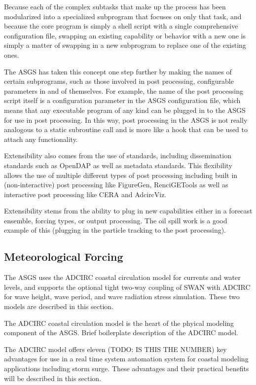 \documentclass[jmse,article,submit,moreauthors,pdftex,12pt,a4paper]{mdpi}
\begin{document}
Because each of the complex subtasks that make up the process has 
been modularized into a specialized subprogram that focuses on only 
that task, and because the core program is simply a shell script 
with a single comprehensive configuration file, swapping an existing 
capability or behavior with a new one is simply a matter of swapping 
in a new subprogram to replace one of the existing ones.

The ASGS has taken this concept one step further by making the names 
of certain subprograms, such as those involved in post processing, 
configurable parameters in and of themselves. For example, the name 
of the post processing script itself is a configuration parameter in 
the ASGS configuration file, which means that any executable program 
of any kind can be plugged in to the ASGS for use in post 
processing. In this way, post processing in the ASGS is not really 
analogous to a static subroutine call and is more like a hook that 
can be used to attach any functionality.  

Extensibility also comes from the use of standards, including 
dissemination standards such as OpenDAP as well as metadata 
standards. This flexibility allows the use of multiple different 
types of post processing including built in (non-interactive) post 
processing like FigureGen, RenciGETools as well as interactive post 
processing like CERA and AdcircViz.

Extensibility stems from the ability to plug in new capabilities 
either in a forecast ensemble, forcing types, or output processing. 
The oil spill work is a good example of this (plugging in the 
particle tracking to the post processing). 

\subsection{Meteorological Forcing}

The ASGS uses the ADCIRC coastal circulation model for currents and 
water levels, and supports the optional tight two-way coupling of 
SWAN with ADCIRC for wave height, wave period, and wave radiation 
stress simulation. These two models are described in this section. 

The ADCIRC coastal circulation model is the heart of the phyical 
modeling component of the ASGS. Brief boilerplate description of the 
ADCIRC model. 

The ADCIRC model offers eleven (TODO: IS THIS THE NUMBER) key 
advantages for use in a real time system automation system for 
coastal modeling applications including storm surge. These 
advantages and their practical benefits will be described in this 
section. 
\end{document}
